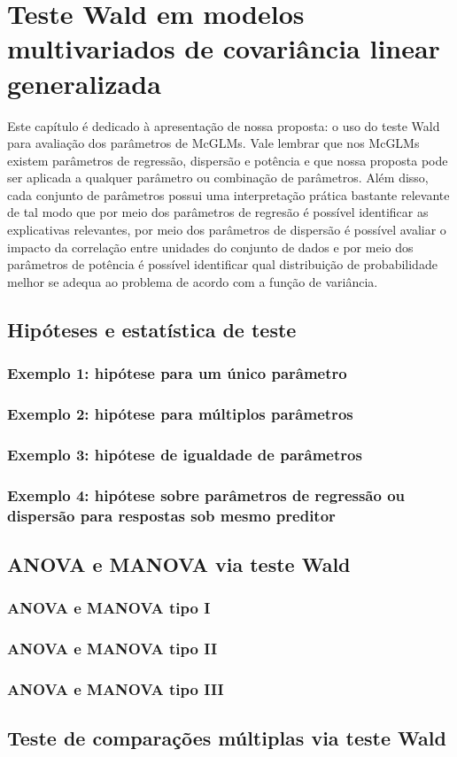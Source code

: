 
\chapter{Teste Wald em modelos multivariados de covariância linear generalizada}

Este capítulo é dedicado à apresentação de nossa proposta: o uso do teste Wald para avaliação dos parâmetros de McGLMs. Vale lembrar que nos McGLMs existem parâmetros de regressão, dispersão e potência e que nossa proposta pode ser aplicada a qualquer parâmetro ou combinação de parâmetros. Além disso, cada conjunto de parâmetros possui uma interpretação prática bastante relevante de tal modo que por meio dos parâmetros de regresão é possível identificar as explicativas relevantes, por meio dos parâmetros de dispersão é possível avaliar o impacto da correlação entre unidades do conjunto de dados e por meio dos parâmetros de potência é possível identificar qual distribuição de probabilidade melhor se adequa ao problema de acordo com a função de variância.


\section{Hipóteses e estatística de teste}
\subsection{Exemplo 1: hipótese para um único parâmetro}
\subsection{Exemplo 2: hipótese para múltiplos parâmetros}
\subsection{Exemplo 3: hipótese de igualdade de parâmetros}
\subsection{Exemplo 4: hipótese sobre parâmetros de regressão ou dispersão para respostas sob mesmo preditor}


\section{ANOVA e MANOVA via teste Wald}
\subsection{ANOVA e MANOVA tipo I}
\subsection{ANOVA e MANOVA tipo II}
\subsection{ANOVA e MANOVA tipo III}


\section{Teste de comparações múltiplas via teste Wald}


